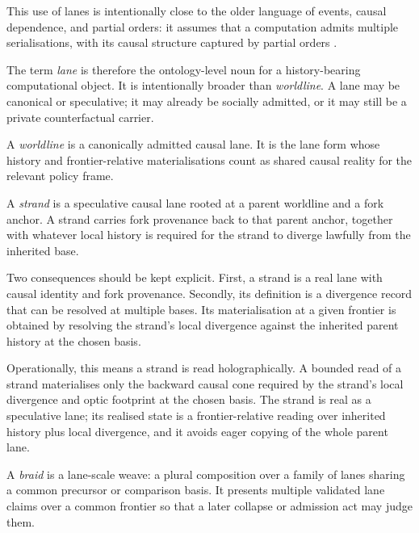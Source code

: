 \documentclass{aion}
\begin{document}
This use of lanes is intentionally close to the older language of events, causal
dependence, and partial orders: it assumes that a computation admits multiple
serialisations, with its causal structure captured by partial orders
\cite{Lamport1978,Winskel1987}.

The term \emph{lane} is therefore the ontology-level noun for a history-bearing computational object. It is intentionally broader than \emph{worldline}. A lane may be canonical or speculative; it may already be socially admitted, or it may still be a private counterfactual carrier.

\begin{definition}[Worldline]
	A \emph{worldline} is a canonically admitted causal lane. It is the lane form whose history and frontier-relative materialisations count as shared causal reality for the relevant policy frame.
\end{definition}

\begin{definition}[Strand]
	A \emph{strand} is a speculative causal lane rooted at a parent worldline and a fork anchor. A strand carries fork provenance back to that parent anchor, together with whatever local history is required for the strand to diverge lawfully from the inherited base.
\end{definition}

Two consequences should be kept explicit. First, a strand is a real lane with causal identity and fork provenance. Secondly, its definition is a divergence record that can be resolved at multiple bases. Its materialisation at a given frontier is obtained by resolving the strand's local divergence against the inherited parent history at the chosen basis.

Operationally, this means a strand is read holographically. A bounded read of a
strand materialises only the backward causal cone required by the strand's local
divergence and optic footprint at the chosen basis. The strand is real as a
speculative lane; its realised state is a frontier-relative reading over
inherited history plus local divergence, and it avoids eager copying of the
whole parent lane.

\begin{definition}[Braid]
		A \emph{braid} is a lane-scale weave: a plural composition over a family of lanes sharing a common precursor or comparison basis. It presents multiple validated lane claims over a common frontier so that a later collapse or admission act may judge them.
\end{definition}
\end{document}
